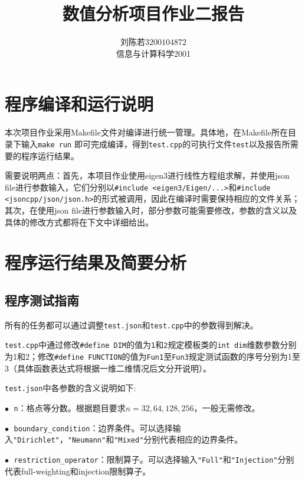 \documentclass{ctexart}
\begin{document}
\begin{sloppypar}
\title{\vspace{-3cm} \textbf{数值分析项目作业二报告}}
\author{刘陈若\;$3200104872$\\信息与计算科学2001}
\date{}

\maketitle

\section{程序编译和运行说明}
本次项目作业采用Makefile文件对编译进行统一管理。具体地，在Makefile所在目录下输入\verb|make run|
即可完成编译，得到\verb|test.cpp|的可执行文件\verb|test|以及报告所需要的程序运行结果。

需要说明两点：首先，本项目作业使用eigen3进行线性方程组求解，并使用json file进行参数输入，它们分别以\verb|#include <eigen3/Eigen/...>|和\verb|#include <jsoncpp/json/json.h>|的形式被调用，因此在编译时需要保持相应的文件关系；其次，在使用json file进行参数输入时，部分参数可能需要修改，参数的含义以及具体的修改方式都将在下文中详细给出。

\section{程序运行结果及简要分析}

\subsection{程序测试指南}
所有的任务都可以通过调整\verb|test.json|和\verb|test.cpp|中的参数得到解决。

\verb|test.cpp|中通过修改\verb|#define DIM|的值为\verb|1|和\verb|2|规定模板类的\verb|int dim|维数参数分别为1和2；修改\verb|#define FUNCTION|的值为\verb|Fun1|至\verb|Fun3|规定测试函数的序号分别为1至3（具体函数表达式将根据一维二维情况后文分开说明）。

\verb|test.json|中各参数的含义说明如下:

$\bullet \;$ \verb|n|：格点等分数。根据题目要求$n=32,64,128,256$，一般无需修改。

$\bullet \;$ \verb|boundary_condition|：边界条件。可以选择输入\verb|"Dirichlet"|，\verb|"Neumann"|和\verb|"Mixed"|分别代表相应的边界条件。

$\bullet \;$ \verb|restriction_operator|：限制算子。可以选择输入\verb|"Full"|和\verb|"Injection"|分别代表full-weighting和injection限制算子。


\end{sloppypar}
\end{document}
